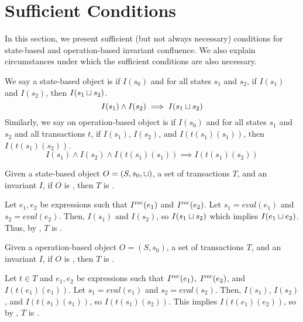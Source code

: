 \section{Sufficient Conditions}
In this section, we present sufficient (but not always necessary) conditions
for state-based and operation-based invariant confluence. We also explain
circumstances under which the sufficient conditions are also necessary.

\begin{definition}
  We say a state-based object is  if $I(s_0)$ and for all
  states $s_1$ and $s_2$, if $I(s_1)$ and $I(s_2)$, then $I(s_1 \sqcup s_2)$.
  \[
    I(s_1) \land I(s_2) \implies I(s_1 \sqcup s_2)
  \]
  Similarly, we say on operation-based object is  if
  $I(s_0)$ and for all states $s_1$ and $s_2$ and all transactions $t$, if
  $I(s_1)$, $I(s_2)$, and $I(t(s_1)(s_1))$, then $I(t(s_1)(s_2))$.
  \[
    I(s_1) \land I(s_2) \land I(t(s_1)(s_1)) \implies I(t(s_1)(s_2))
  \]

\end{definition}

\begin{claim}
  Given a state-based object $O = (S, s_0, \sqcup)$, a set of transactions $T$,
  and an invariant $I$, if $O$ is \Iclosed{}, then $T$ is \Iconfluent.
\end{claim}
\begin{elidableproof}
  Let $e_1, e_2$ be expressions such that $I^{\text{rec}}(e_1)$ and $I^{\text{rec}}(e_2)$. Let
  $s_1 = eval(e_1)$ and $s_2 = eval(e_2)$. Then, $I(s_1)$ and $I(s_2)$, so
  $I(s_1 \sqcup s_2)$ which implies $I(e_1 \sqcup e_2)$. Thus, by
  , $T$ is \Iconfluent{}.
\end{elidableproof}

\begin{claim}
  Given a operation-based object $O = (S, s_0)$, a set of transactions $T$, and
  an invariant $I$, if $O$ is \Iclosed{}, then $T$ is \Iconfluent.
\end{claim}
\begin{elidableproof}
  Let $t \in T$ and $e_1, e_2$ be expressions such that $I^{\text{rec}}(e_1)$,
  $I^{\text{rec}}(e_2)$, and $I(t(e_1)(e_1))$. Let $s_1 = eval(e_1)$ and $s_2 =
  eval(s_2)$. Then, $I(s_1)$, $I(s_2)$, and $I(t(s_1)(s_1))$, so
  $I(t(s_1)(s_2))$. This implies $I(t(e_1)(e_2))$, so by
  , $T$ is \Iconfluent.
\end{elidableproof}

